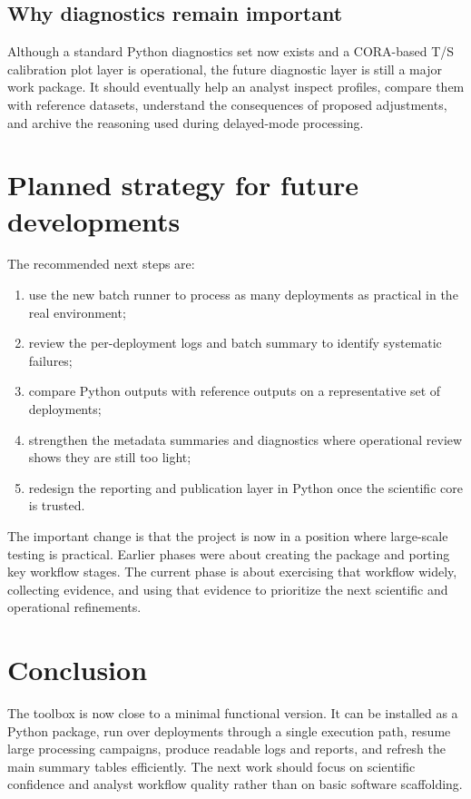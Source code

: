 \documentclass[11pt,a4paper]{article}
\begin{document}
\subsection{Why diagnostics remain important}

Although a standard Python diagnostics set now exists and a CORA-based T/S calibration plot layer is operational, the future diagnostic layer is still a major work package. It should eventually help an analyst inspect profiles, compare them with reference datasets, understand the consequences of proposed adjustments, and archive the reasoning used during delayed-mode processing.

\section{Planned strategy for future developments}

The recommended next steps are:

\begin{enumerate}[leftmargin=1.6em]
  \item use the new batch runner to process as many deployments as practical in the real environment;
  \item review the per-deployment logs and batch summary to identify systematic failures;
  \item compare Python outputs with reference outputs on a representative set of deployments;
  \item strengthen the metadata summaries and diagnostics where operational review shows they are still too light;
  \item redesign the reporting and publication layer in Python once the scientific core is trusted.
\end{enumerate}

The important change is that the project is now in a position where large-scale testing is practical. Earlier phases were about creating the package and porting key workflow stages. The current phase is about exercising that workflow widely, collecting evidence, and using that evidence to prioritize the next scientific and operational refinements.

\section{Conclusion}

The toolbox is now close to a minimal functional version. It can be installed as a Python package, run over deployments through a single execution path, resume large processing campaigns, produce readable logs and reports, and refresh the main summary tables efficiently. The next work should focus on scientific confidence and analyst workflow quality rather than on basic software scaffolding.
\end{document}
